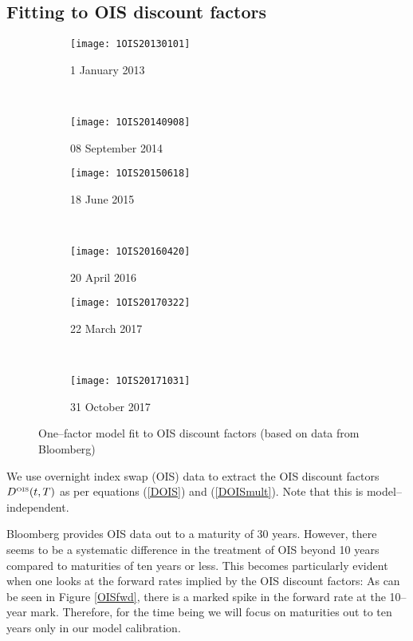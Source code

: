 \documentclass[12pt,a4paper]{article}
\theoremstyle{plain}
\numberwithin{equation}{section}
\begin{document}
\subsection{Fitting to OIS discount factors}\label{OISfit}
\begin{figure}[t]
  \centering
    \begin{subfigure}[b]{0.53\textwidth}
        \texttt{[image: 1OIS20130101]}
        \caption{1 January 2013}
        \label{fig:u}
    \end{subfigure}
    ~
    \begin{subfigure}[b]{0.53\textwidth}
        \texttt{[image: 1OIS20140908]}
       \caption{08 September 2014}
        \label{figx}
    \end{subfigure}

\begin{subfigure}[b]{0.53\textwidth}
        \texttt{[image: 1OIS20150618]}
       \caption{18 June 2015}
        \label{figx}
    \end{subfigure}
    ~
     \begin{subfigure}[b]{0.53\textwidth}
        \texttt{[image: 1OIS20160420]}
       \caption{20 April 2016}
        \label{figxa}
    \end{subfigure}


    \begin{subfigure}[b]{0.53\textwidth}
        \texttt{[image: 1OIS20170322]}
       \caption{22 March 2017}
        \label{figx}
    \end{subfigure}
    ~
     \begin{subfigure}[b]{0.53\textwidth}
        \texttt{[image: 1OIS20171031]}
       \caption{31 October 2017}
        \label{figxa}
    \end{subfigure}
    \caption{One--factor model fit to OIS discount factors (based on data from Bloomberg)}\label{OIS1Factor}
    \end{figure}
We use overnight index swap (OIS) data to extract the OIS discount factors $D^{\tiny \mbox{OIS}}(t,T)$ as per equations (\ref{DOIS}) and (\ref{DOISmult}). Note that this is model--independent.

Bloomberg provides OIS data out to a maturity of 30 years. However, there seems to be a systematic difference in the treatment of OIS beyond 10 years compared to maturities of ten years or less. This becomes particularly evident when one looks at the forward rates implied by the OIS discount factors: As can be seen in Figure \ref{OISfwd}, there is a marked spike in the forward rate at the 10--year mark. Therefore, for the time being we will focus on maturities out to ten years only in our model calibration.
\end{document}
